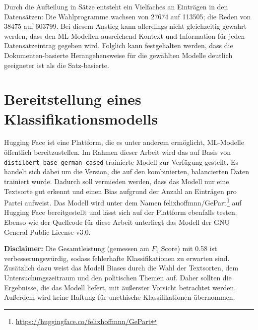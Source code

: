 Durch die Aufteilung in Sätze entsteht ein Vielfaches an Einträgen in den Datensätzen: Die Wahlprogramme wachsen von \num{27674} auf \num{113505}; die Reden von \num{38475} auf \num{603799}. Bei diesem Anstieg kann allerdings nicht gleichzeitig gewahrt werden, dass den \ac{ML}-Modellen ausreichend Kontext und Information für jeden Datensatzeintrag gegeben wird. Folglich kann festgehalten werden, dass die Dokumenten-basierte Herangehensweise für die gewählten Modelle deutlich geeigneter ist als die Satz-basierte.

\section{Bereitstellung eines Klassifikationsmodells} \label{sec:crispDm_4}

Hugging Face ist eine Plattform, die es unter anderem ermöglicht, \ac{ML}-Modelle öffentlich bereitzustellen. Im Rahmen dieser Arbeit wird das auf Basis von \texttt{distilbert-base\--german-cased} trainierte Modell zur Verfügung gestellt. Es handelt sich dabei um die Version, die auf den kombinierten, balancierten Daten trainiert wurde. Dadurch soll vermieden werden, dass das Modell nur eine Textsorte gut erkennt und einen Bias aufgrund der Anzahl an Einträgen pro Partei aufweist. Das Modell wird unter dem Namen felixhoffmnn/GePart\footnote{\href{https://huggingface.co/felixhoffmnn/GePart}{https://huggingface.co/felixhoffmnn/GePart}} auf Hugging Face bereitgestellt und lässt sich auf der Plattform ebenfalls testen. Ebenso wie der Quellcode für diese Arbeit unterliegt das Modell der GNU General Public License v3.0.

\textbf{Disclaimer:} Die Gesamtleistung (gemessen am \(F_1\) Score) mit \num{0.58} ist verbesserungswürdig, sodass fehlerhafte Klassifikationen zu erwarten sind. Zusätzlich dazu weist das Modell Biases durch die Wahl der Textsorten, dem Untersuchungszeitraum und den politischen Themen auf. Daher sollten die Ergebnisse, die das Modell liefert, mit äußerster Vorsicht betrachtet werden. Außerdem wird keine Haftung für unethische Klassifikationen übernommen.
